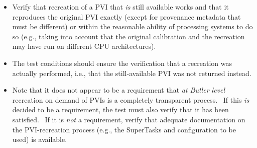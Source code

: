 \begin{itemize}
\tightlist
\item
  Verify that recreation of a PVI that \emph{is} still available works
  and that it reproduces the original PVI exactly (except for provenance
  metadata that must be different) or within the reasonable ability of
  processing systems to do so (e.g., taking into account that the
  original calibration and the recreation may have run on different CPU
  architectures).
\item
  The test conditions should ensure the verification that a recreation
  was actually performed, i.e., that the still-available PVI was not
  returned instead.
\item
  Note that it does not appear to be a requirement that \emph{at Butler
  level} recreation on demand of PVIs is a completely transparent
  process. ~If this \emph{is} decided to be a requirement, the test must
  also verify that it has been satisfied. ~If it is \emph{not} a
  requirement, verify that adequate documentation on the PVI-recreation
  process (e.g., the SuperTasks and configuration to be used) is
  available.
\end{itemize}

